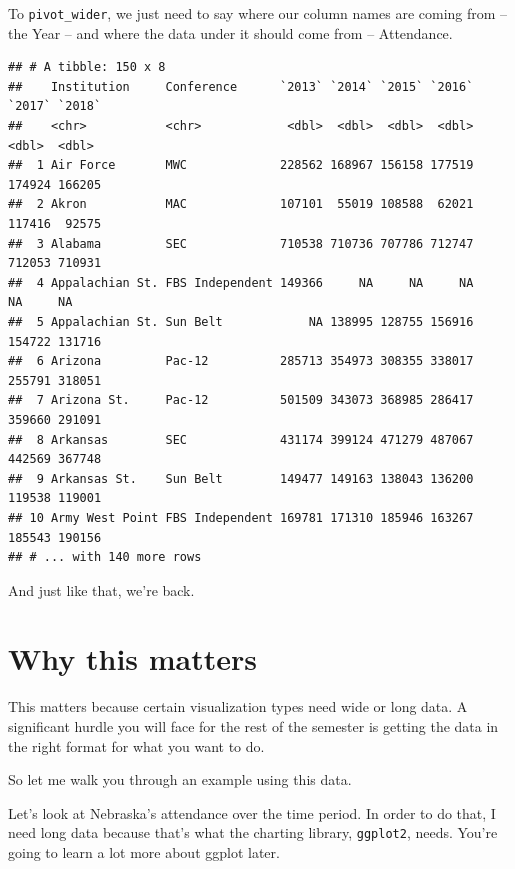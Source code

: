 \documentclass[
]{book}
\newenvironment{Shaded}{\begin{snugshade}}{\end{snugshade}}
\newcommand{\DataTypeTok}[1]{\textcolor[rgb]{0.13,0.29,0.53}{#1}}
\newcommand{\KeywordTok}[1]{\textcolor[rgb]{0.13,0.29,0.53}{\textbf{#1}}}
\newcommand{\NormalTok}[1]{#1}
\newcommand{\OperatorTok}[1]{\textcolor[rgb]{0.81,0.36,0.00}{\textbf{#1}}}
\newcommand{\StringTok}[1]{\textcolor[rgb]{0.31,0.60,0.02}{#1}}
\begin{document}
To \texttt{pivot\_wider}, we just need to say where our column names are coming from -- the Year -- and where the data under it should come from -- Attendance.

\begin{Shaded}
\end{Shaded}

\begin{verbatim}
## # A tibble: 150 x 8
##    Institution     Conference      `2013` `2014` `2015` `2016` `2017` `2018`
##    <chr>           <chr>            <dbl>  <dbl>  <dbl>  <dbl>  <dbl>  <dbl>
##  1 Air Force       MWC             228562 168967 156158 177519 174924 166205
##  2 Akron           MAC             107101  55019 108588  62021 117416  92575
##  3 Alabama         SEC             710538 710736 707786 712747 712053 710931
##  4 Appalachian St. FBS Independent 149366     NA     NA     NA     NA     NA
##  5 Appalachian St. Sun Belt            NA 138995 128755 156916 154722 131716
##  6 Arizona         Pac-12          285713 354973 308355 338017 255791 318051
##  7 Arizona St.     Pac-12          501509 343073 368985 286417 359660 291091
##  8 Arkansas        SEC             431174 399124 471279 487067 442569 367748
##  9 Arkansas St.    Sun Belt        149477 149163 138043 136200 119538 119001
## 10 Army West Point FBS Independent 169781 171310 185946 163267 185543 190156
## # ... with 140 more rows
\end{verbatim}

And just like that, we're back.

\hypertarget{why-this-matters}{%
\section{Why this matters}\label{why-this-matters}}

This matters because certain visualization types need wide or long data. A significant hurdle you will face for the rest of the semester is getting the data in the right format for what you want to do.

So let me walk you through an example using this data.

Let's look at Nebraska's attendance over the time period. In order to do that, I need long data because that's what the charting library, \texttt{ggplot2}, needs. You're going to learn a lot more about ggplot later.
\end{document}

